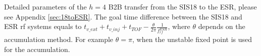 Detailed parameters of the $h=4$ B2B transfer from the SIS18 to the ESR, please see Appendix \ref{sec:18toESR}.   
The goal time difference between the SIS18 and ESR rf systems equals to $t_{v\_ext}+t_{v\_inj}+t_{TOF}-\frac{\theta}{2\pi}\frac{1}{f_\mathit{rf}^\mathit{ESR}}$, where $\theta$ depends on the accumulation method. For example $\theta=\pi$, when the unstable fixed point is used for the accumulation.

